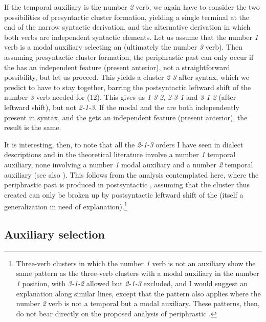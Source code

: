 \documentclass[output=paper]{LSP/langsci}
\begin{document}
  If the temporal auxiliary is the {number} \textit{2} verb, we again have to consider the two possibilities of presyntactic cluster formation, yielding a single terminal at the end of the narrow syntactic derivation, and the alternative derivation in which both verbs are independent syntactic elements. Let us assume that the {number} \textit{1} verb is a modal auxiliary selecting an  (ultimately the {number} \textit{3} verb). Then assuming presyntactic cluster formation, the periphrastic past can only occur if the  has an independent  feature (present anterior), not a straightforward possibility, but let us proceed. This yields a cluster \textit{2-3} after syntax, which we predict to have to stay together, barring the postsyntactic leftward shift of the number \textit{3} verb needed for (12). This gives us \textit{1-3-2}, \textit{2-3-1} and \textit{3-1-2} (after leftward shift), but not \textit{2-1-3}. If the modal and the  are both independently present in syntax, and the  gets an independent  feature (present anterior), the result is the same. 

  It is interesting, then, to note that all the \textit{2-1-3} orders I have seen in dialect descriptions and in the theoretical literature involve a number \textit{1} temporal auxiliary, none involving a number \textit{1} modal auxiliary and a number \textit{2} temporal auxiliary (see also \citealt[271]{Schallert2014}). This follows from the analysis contemplated here, where the periphrastic past is produced in postsyntactic , assuming that the cluster thus created can only be broken up by postsyntactic leftward shift of the  (itself a generalization in need of explanation).\footnote{Three-verb clusters in which the number \textit{1} verb is not an auxiliary show the same pattern as the three-verb clusters with a modal auxiliary in the number \textit{1} position, with \textit{3-1-2} allowed but \textit{2-1-3} excluded, and I would suggest an explanation along similar lines, except that the pattern also applies where the number \textit{2} verb is not a temporal but a modal auxiliary. These patterns, then, do not bear directly on the proposed analysis of periphrastic .}

\subsection{Auxiliary selection}
\end{document}
